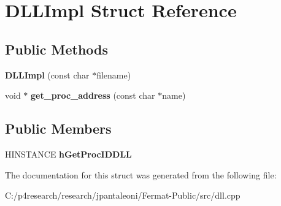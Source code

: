 \hypertarget{struct_d_l_l_impl}{}\section{D\+L\+L\+Impl Struct Reference}
\label{struct_d_l_l_impl}
\subsection*{Public Methods}
\begin{DoxyCompactItemize}
\item 
\mbox{\label{struct_d_l_l_impl_a85b0edd597b571cffbd1d623773c7d19}} 
{\bfseries D\+L\+L\+Impl} (const char $\ast$filename)
\item 
\mbox{\label{struct_d_l_l_impl_a48221a4f9b500bca1e6bc77a430b2f0d}} 
void $\ast$ {\bfseries get\+\_\+proc\+\_\+address} (const char $\ast$name)
\end{DoxyCompactItemize}
\subsection*{Public Members}
\begin{DoxyCompactItemize}
\item 
\mbox{\label{struct_d_l_l_impl_a4d0a2556e062d9b8ef6164ee12ce26e2}} 
H\+I\+N\+S\+T\+A\+N\+CE {\bfseries h\+Get\+Proc\+I\+D\+D\+LL}
\end{DoxyCompactItemize}


The documentation for this struct was generated from the following file\+:\begin{DoxyCompactItemize}
\item 
C\+:/p4research/research/jpantaleoni/\+Fermat-\/\+Public/src/dll.\+cpp\end{DoxyCompactItemize}
